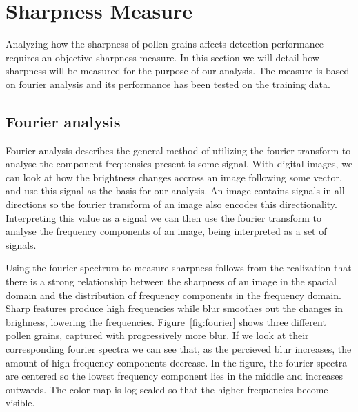 
\section{Sharpness Measure}\label{sec:method-sharpness}
Analyzing how the sharpness of pollen grains affects detection performance requires an objective sharpness measure.
In this section we will detail how sharpness will be measured for the purpose of our analysis.
The measure is based on fourier analysis and its performance has been tested on the training data.

\subsection{Fourier analysis}
Fourier analysis describes the general method of utilizing the fourier transform to analyse the component frequensies present is some signal.
With digital images, we can look at how the brightness changes accross an image following some vector, and use this signal as the basis for our analysis.
An image contains signals in all directions so the fourier transform of an image also encodes this directionality.
Interpreting this value as a signal we can then use the fourier transform to analyse the frequency components of an image, being interpreted as a set of signals.

Using the fourier spectrum to measure sharpness follows from the realization that there is a strong relationship between the sharpness of an image in the spacial domain and the distribution of frequency components in the frequency domain.
Sharp features produce high frequencies while blur smoothes out the changes in brighness, lowering the frequencies.
Figure~\ref{fig:fourier} shows three different pollen grains, captured with progressively more blur.
If we look at their corresponding fourier spectra we can see that, as the percieved blur increases, the amount of high frequency components decrease.
In the figure, the fourier spectra are centered so the lowest frequency component lies in the middle and increases outwards.
The color map is log scaled so that the higher frequencies become visible.

